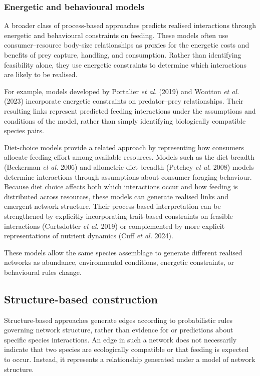\documentclass[
]{article}
\begin{document}
\subsubsection{Energetic and behavioural
models}\label{energetic-and-behavioural-models}

A broader class of process-based approaches predicts realised
interactions through energetic and behavioural constraints on feeding.
These models often use consumer--resource body-size relationships as
proxies for the energetic costs and benefits of prey capture, handling,
and consumption. Rather than identifying feasibility alone, they use
energetic constraints to determine which interactions are likely to be
realised.

For example, models developed by Portalier \emph{et al.} (2019) and
Wootton \emph{et al.} (2023) incorporate energetic constraints on
predator--prey relationships. Their resulting links represent predicted
feeding interactions under the assumptions and conditions of the model,
rather than simply identifying biologically compatible species pairs.

Diet-choice models provide a related approach by representing how
consumers allocate feeding effort among available resources. Models such
as the diet breadth (Beckerman \emph{et al.} 2006) and allometric diet
breadth (Petchey \emph{et al.} 2008) models determine interactions
through assumptions about consumer foraging behaviour. Because diet
choice affects both which interactions occur and how feeding is
distributed across resources, these models can generate realised links
and emergent network structure. Their process-based interpretation can
be strengthened by explicitly incorporating trait-based constraints on
feasible interactions (Curtsdotter \emph{et al.} 2019) or complemented
by more explicit representations of nutrient dynamics (Cuff \emph{et
al.} 2024).

These models allow the same species assemblage to generate different
realised networks as abundance, environmental conditions, energetic
constraints, or behavioural rules change.

\subsection{Structure-based construction}\label{sec-construct-random}

Structure-based approaches generate edges according to probabilistic
rules governing network structure, rather than evidence for or
predictions about specific species interactions. An edge in such a
network does not necessarily indicate that two species are ecologically
compatible or that feeding is expected to occur. Instead, it represents
a relationship generated under a model of network structure.
\end{document}
